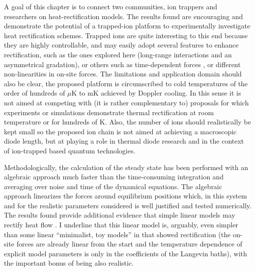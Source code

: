 A goal of this chapter is to connect two communities, ion trappers and
researchers on heat-rectification models. The results found are encouraging and demonstrate the potential of a trapped-ion platform to experimentally investigate heat rectification schemes. Trapped ions are quite interesting to this end because  they are highly controllable,  and may easily adopt several features to enhance rectification, such as
the ones explored here (long-range interactions and an asymmetrical gradation),
or others such as time-dependent forces \cite{Li2012,Riera-Campeny2018}, or different non-linearities in on-site forces.
The limitations and application domain should also be clear,  the proposed platform is circumscribed to cold temperatures of the order of hundreds of $\mu$K to mK achieved by Doppler cooling.
In this sense it is not aimed at competing  with (it is rather complementary to)
proposals for which experiments  \cite{Chang2006,Leitner2013,Kobayashi2009,Elzouka2017} or simulations \cite{Zhang2015,Ma2018,Reid2019}
demonstrate thermal rectification
at room temperature or for hundreds of K.
Also, the number of ions should realistically be kept small so the proposed ion chain
is not aimed at achieving a macroscopic diode length, but at playing a role in thermal diode research
and in the context of ion-trapped based quantum technologies.

Methodologically, the calculation of the steady state has been performed with an algebraic approach much faster than
the time-consuming integration and averaging over noise and time of the dynamical equations.
The algebraic approach linearizes the forces around equilibrium positions which, in this system and for the realistic parameters considered  is well justified and tested numerically.
The results found provide additional evidence that simple linear models may  rectify heat flow \cite{Pereira2017}.  I  underline that this linear
model is, arguably,  even simpler than some linear ``minimalist, toy models'' in \cite{Pereira2017} that showed rectification (the on-site forces are already linear from the start and the temperature dependence of explicit model parameters is only in the coefficients of the Langevin baths), with the important bonus of being also realistic.
